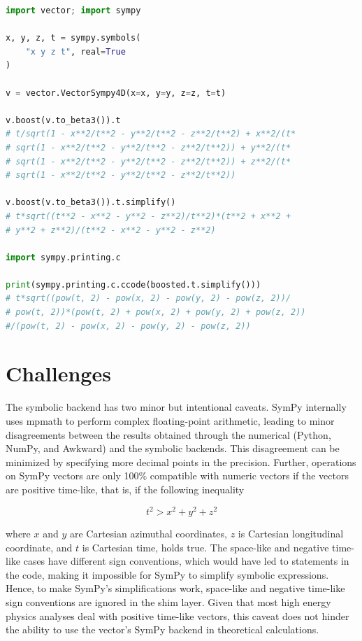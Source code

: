 \documentclass{webofc}
\begin{document}
\begin{lstlisting}[language=Python,mathescape=true,caption={Simplifying expressions and converting theem into code for another programming language.},captionpos=b, label={vector-sympy-extra}]
import vector; import sympy

x, y, z, t = sympy.symbols(
    "x y z t", real=True
)

v = vector.VectorSympy4D(x=x, y=y, z=z, t=t)

v.boost(v.to_beta3()).t
# t/sqrt(1 - x**2/t**2 - y**2/t**2 - z**2/t**2) + x**2/(t*
# sqrt(1 - x**2/t**2 - y**2/t**2 - z**2/t**2)) + y**2/(t*
# sqrt(1 - x**2/t**2 - y**2/t**2 - z**2/t**2)) + z**2/(t*
# sqrt(1 - x**2/t**2 - y**2/t**2 - z**2/t**2))

v.boost(v.to_beta3()).t.simplify()
# t*sqrt((t**2 - x**2 - y**2 - z**2)/t**2)*(t**2 + x**2 +
# y**2 + z**2)/(t**2 - x**2 - y**2 - z**2)

import sympy.printing.c

print(sympy.printing.c.ccode(boosted.t.simplify()))
# t*sqrt((pow(t, 2) - pow(x, 2) - pow(y, 2) - pow(z, 2))/
# pow(t, 2))*(pow(t, 2) + pow(x, 2) + pow(y, 2) + pow(z, 2))
#/(pow(t, 2) - pow(x, 2) - pow(y, 2) - pow(z, 2))
\end{lstlisting}

\section{Challenges}
\label{sec-challenges}

The symbolic backend has two minor but intentional caveats. SymPy internally uses mpmath \cite{mpmath} to perform complex floating-point arithmetic, leading to minor disagreements between the results obtained through the numerical (Python, NumPy, and Awkward) and the symbolic backends. This disagreement can be minimized by specifying more decimal points in the precision. Further, operations on SymPy vectors are only 100\% compatible with numeric vectors if the vectors are positive time-like, that is, if the following inequality

\begin{equation} \label{ineq-positive-time}
t^{2} > x^{2} + y^{2} + z^{2}
\end{equation}

where $x$ and $y$ are Cartesian azimuthal coordinates, $z$ is Cartesian longitudinal coordinate, and $t$ is Cartesian time, holds true. The space-like and negative time-like cases have different sign conventions, which would have led to  statements in the code, making it impossible for SymPy to simplify symbolic expressions. Hence, to make SymPy's simplifications work, space-like and negative time-like sign conventions are ignored in the shim layer. Given that most high energy physics analyses deal with positive time-like vectors, this caveat does not hinder the ability to use the vector's SymPy backend in theoretical calculations.
\end{document}
